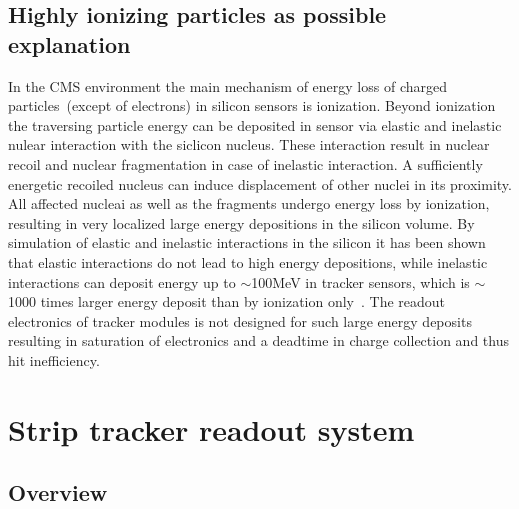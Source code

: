 




\subsection{Highly ionizing particles as possible explanation}

In the CMS environment the main mechanism of energy loss of charged particles~(except of electrons) in silicon sensors is ionization. Beyond ionization the traversing particle energy can be deposited in sensor via elastic and inelastic nulear interaction with the siclicon nucleus. These interaction result in nuclear recoil and nuclear fragmentation in case of inelastic interaction. A sufficiently energetic recoiled nucleus can induce displacement of other nuclei in its proximity. All affected nucleai as well as the fragments undergo energy loss by ionization, resulting in very localized large energy depositions in the silicon volume. By simulation of elastic and inelastic interactions in the silicon it has been shown that elastic interactions do not lead to high energy depositions, while inelastic interactions can deposit energy up to $\sim$100MeV in tracker sensors, which is $\sim$1000 times larger energy deposit than by ionization only~\cite{Huhtinen:2002yda}. The readout electronics of tracker modules is not designed for such large energy deposits resulting in saturation of electronics and a deadtime in charge collection and thus hit inefficiency.

\section{Strip tracker readout system}

\subsection{Overview}

